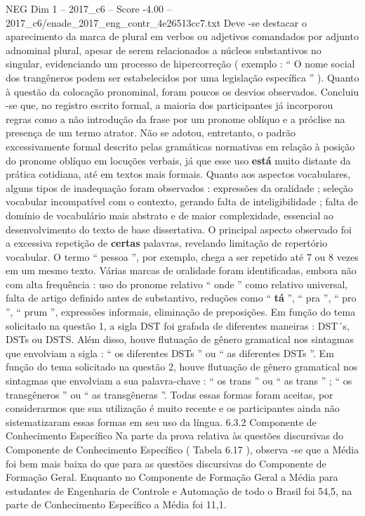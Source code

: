 \begin{textsample}{NEG Dim 1 – 2017\_c6 – Score -4.00 – 2017\_c6/enade\_2017\_eng\_contr\_4e26513cc7.txt}
Deve -se destacar o aparecimento da marca de plural em verbos ou adjetivos comandados por adjunto adnominal plural, apesar de serem relacionados a núcleos substantivos no singular, evidenciando um processo de hipercorreção ( exemplo : “ O nome social dos trangêneros podem ser estabelecidos por uma legislação específica ” ).
Quanto à questão da colocação pronominal, foram poucos os desvios observados.
Concluiu -se que, no registro escrito formal, a maioria dos participantes já incorporou regras como a não introdução da frase por um pronome oblíquo e a próclise na presença de um termo atrator.
Não se adotou, entretanto, o padrão excessivamente formal descrito pelas gramáticas normativas em relação à posição do pronome oblíquo em locuções verbais, já que esse uso \textbf{está} muito distante da prática cotidiana, até em textos mais formais.
Quanto aos aspectos vocabulares, alguns tipos de inadequação foram observados : expressões da oralidade ; seleção vocabular incompatível com o contexto, gerando falta de inteligibilidade ; falta de domínio de vocabulário mais abstrato e de maior complexidade, essencial ao desenvolvimento do texto de base dissertativa.
O principal aspecto observado foi a excessiva repetição de \textbf{certas} palavras, revelando limitação de repertório vocabular.
O termo “ pessoa ”, por exemplo, chega a ser repetido até 7 ou 8 vezes em um mesmo texto.
Várias marcas de oralidade foram identificadas, embora não com alta frequência : uso do pronome relativo “ onde ” como relativo universal, falta de artigo definido antes de substantivo, reduções como “ \textbf{tá} ”, “ pra ”, “ pro ”, “ prum ”, expressões informais, eliminação de preposições.
Em função do tema solicitado na questão 1, a sigla DST foi grafada de diferentes maneiras : DST´s, DSTs ou DSTS.
Além disso, houve flutuação de gênero gramatical nos sintagmas que envolviam a sigla : “ os diferentes DSTs ” ou “ as diferentes DSTs ”.
Em função do tema solicitado na questão 2, houve flutuação de gênero gramatical nos sintagmas que envolviam a sua palavra-chave : “ os trans ” ou “ as trans ” ; “ os transgêneros ” ou “ as transgêneras ”.
Todas essas formas foram aceitas, por considerarmos que sua utilização é muito recente e os participantes ainda não sistematizaram essas formas em seu uso da língua. 6.3.2 Componente de Conhecimento Específico Na parte da prova relativa às questões discursivas do Componente de Conhecimento Específico ( Tabela 6.17 ), observa -se que a Média foi bem mais baixa do que para as questões discursivas do Componente de Formação Geral.
Enquanto no Componente de Formação Geral a Média para estudantes de Engenharia de Controle e Automação de todo o Brasil foi 54,5, na parte de Conhecimento Específico a Média foi 11,1.

\end{textsample}
